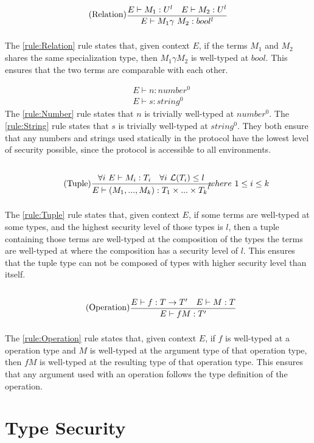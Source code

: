 \begin{align*}
    \tag{Relation}\label{rule:Relation} &\infrule{E\vdash M_1:U^l\quad E\vdash M_2:U^l}{E\vdash M_1 \gamma\ M_2:bool^{l}}
\end{align*}
The \ref{rule:Relation} rule states that, given context $E$, if the terms $M_1$ and $M_2$ shares the same specialization type, then $M_1\gamma M_2$ is well-typed at $bool$. This ensures that the two terms are comparable with each other.

\begin{align*}
    \tag{Number}\label{rule:Number} &E\vdash n:{number^0}\\
    \tag{String}\label{rule:String} &E\vdash s:{string^0}
\end{align*}
The \ref{rule:Number} rule states that $n$ is trivially well-typed at $number^0$.
The \ref{rule:String} rule states that $s$ is trivially well-typed at $string^0$.
They both ensure that any numbers and strings used statically in the protocol have the lowest level of security possible, since the protocol is accessible to all environments.

\begin{align*}
    \tag{Tuple}\label{rule:Tuple} &\infrule{\forall i\ E\vdash M_i:T_i\quad \forall i\ \level{T_i}\leq l}{E\vdash (M_1,...,M_k):{T_1\times...\times T_k}^l}& where\ 1\leq i\leq k
\end{align*}
The \ref{rule:Tuple} rule states that, given context $E$, if some terms are well-typed at some types, and the highest security level of those types is $l$, then a tuple containing those terms are well-typed at the composition of the types the terms are well-typed at where the composition has a security level of $l$.
This ensures that the tuple type can not be composed of types with higher security level than itself.

\begin{align*}
    \tag{Operation}\label{rule:Operation} &\infrule{E\vdash f:T\ra T'\quad E\vdash M:T}{E\vdash fM:T'}
\end{align*}
The \ref{rule:Operation} rule states that, given context $E$, if $f$ is well-typed at a operation type and $M$ is well-typed at the argument type of that operation type, then $fM$ is well-typed at the resulting type of that operation type.
This ensures that any argument used with an operation follows the type definition of the operation.

\section{Type Security}

